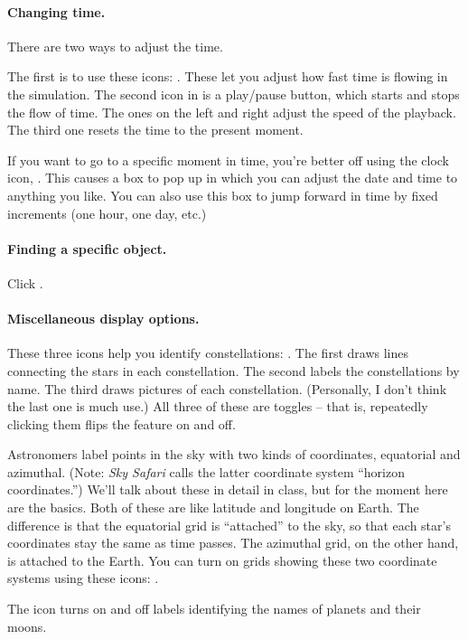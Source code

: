 \paragraph{Changing time.} There are two ways to adjust the 
time.

The first is to use these icons: 
. These let you adjust
how fast time is flowing in the simulation.
The second icon in is a play/pause button, which starts and stops the flow
of time. The ones on the left and right adjust the speed of the playback.
The third one resets the time to the present moment.

If you want to go to a specific moment in time, you're better off
using the clock icon, . This causes a
box to pop up in which you can adjust the date and time to anything
you like. You can also use this box to jump forward in time by fixed
increments (one hour, one day, etc.)

\paragraph{Finding a specific object.} Click .

\paragraph{Miscellaneous display options.} 

These three icons help you identify
constellations: . The first draws lines connecting
the stars in each constellation. The second labels the constellations by
name. The third draws pictures of each constellation. (Personally, I
don't think the last one is much use.) All three of these are toggles --
that is, repeatedly clicking them flips the feature on and off.

Astronomers label points in the sky with two kinds of coordinates, equatorial
and azimuthal. (Note: \textit{Sky Safari} calls the latter
coordinate system ``horizon coordinates.'') 
We'll talk about these in detail in class,
but for the moment here are the basics.
Both of these are like latitude and longitude on Earth. The
difference is that the equatorial grid is ``attached'' to the sky, so
that each star's coordinates stay the same as time passes. The azimuthal 
grid, on the other hand, 
is attached to the Earth. You can turn on grids showing these two coordinate systems
using these icons: .

The  icon turns on and off labels identifying the names of 
planets
and their moons.

